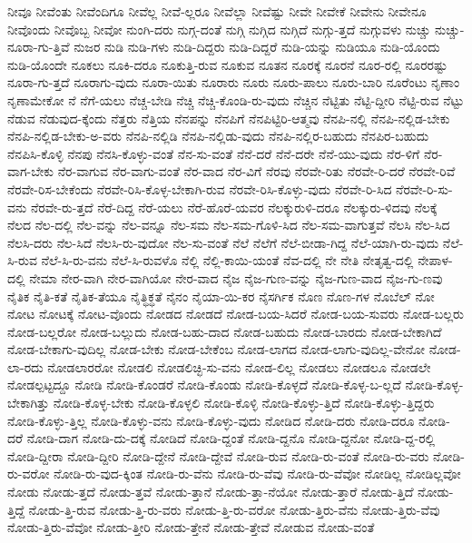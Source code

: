 {ನೀವೂ
ನೀವೆಂತು
ನೀವೆಂದಿಗೂ
ನೀವೆಲ್ಲ
ನೀವೆ-ಲ್ಲರೂ
ನೀವೆಲ್ಲಾ
ನೀವೆಷ್ಟು
ನೀವೇ
ನೀವೇಕೆ
ನೀವೇನು
ನೀವೇನೂ
ನೀವೊಂದು
ನೀವೊಬ್ಬ
ನೀವೋ
ನುಂಗಿ-ದರು
ನುಗ್ಗ-ದಂತೆ
ನುಗ್ಗಿ
ನುಗ್ಗಿದ
ನುಗ್ಗಿದೆ
ನುಗ್ಗು-ತ್ತದೆ
ನುಗ್ಗುವಳು
ನುಚ್ಚು
ನುಚ್ಚು-ನೂರಾ-ಗು-ತ್ತಿವೆ
ನುಜರ
ನುಡಿ
ನುಡಿ-ಗಳು
ನುಡಿ-ದಿದ್ದರು
ನುಡಿ-ದಿದ್ದರೆ
ನುಡಿ-ಯನ್ನು
ನುಡಿಯೂ
ನುಡಿ-ಯೊಂದು
ನುಡಿ-ಯೊಂದೇ
ನೂಕಲು
ನೂಕಿ-ದರೂ
ನೂಕುತ್ತಿ-ರುವ
ನೂಕುವ
ನೂತನ
ನೂರಕ್ಕೆ
ನೂರನೆ
ನೂರ-ರಲ್ಲಿ
ನೂರರಷ್ಟು
ನೂರಾ-ಗು-ತ್ತದೆ
ನೂರಾಗು-ವುದು
ನೂರಾ-ಯಿತು
ನೂರಾರು
ನೂರು
ನೂರು-ಪಾಲು
ನೂರು-ಬಾರಿ
ನೂರೆಂಟು
ನೃಣಾಂ
ನೃಣಾಮೇಕೋ
ನೆ
ನೆಗೆ-ಯಲು
ನೆಚ್ಚ-ಬೇಡಿ
ನೆಚ್ಚಿ
ನೆಚ್ಚಿ-ಕೊಂಡಿ-ರು-ವುದು
ನೆಚ್ಚಿನ
ನೆಟ್ಟಿತು
ನೆಟ್ಟಿ-ದ್ದೀರಿ
ನೆಟ್ಟಿ-ರುವ
ನೆಟ್ಟು
ನೆಡುವ
ನೆಡುವುದ-ಕ್ಕೆಂದು
ನೆತ್ತರು
ನೆತ್ತಿಯ
ನೆನಪನ್ನು
ನೆನಪಿಗೆ
ನೆನಪಿಟ್ಟಿರಿ-ಆತ್ಮವು
ನೆನಪಿ-ನಲ್ಲಿ
ನೆನಪಿ-ನಲ್ಲಿಡ-ಬೇಕು
ನೆನಪಿ-ನಲ್ಲಿಡ-ಬೇಕು-ಅ-ವರು
ನೆನಪಿ-ನಲ್ಲಿಡಿ
ನೆನಪಿ-ನಲ್ಲಿಡು-ವುದು
ನೆನಪಿ-ನಲ್ಲಿರ-ಬಹುದು
ನೆನಪಿರ-ಬಹುದು
ನೆನಪಿಸಿ-ಕೊಳ್ಳಿ
ನೆನಪು
ನೆನಸಿ-ಕೊಳ್ಳು-ವಂತೆ
ನೆನ-ಸು-ವಂತೆ
ನೆನೆ-ದರೆ
ನೆನೆ-ದರೇ
ನೆನೆ-ಯು-ವುದು
ನೆರ-ಳಿಗೆ
ನೆರ-ವಾಗ-ಬೇಕು
ನೆರ-ವಾಗುವ
ನೆರ-ವಾಗು-ವಂತೆ
ನೆರ-ವಾದ
ನೆರ-ವಿಗೆ
ನೆರವು
ನೆರವೇ-ರಿತು
ನೆರವೇ-ರಿ-ದರೆ
ನೆರವೇ-ರಿವೆ
ನೆರವೇ-ರಿಸ-ಬೇಕೆಂದು
ನೆರವೇ-ರಿಸಿ-ಕೊಳ್ಳ-ಬೇಕಾಗಿ-ರುವ
ನೆರವೇ-ರಿಸಿ-ಕೊಳ್ಳು-ವುದು
ನೆರವೇ-ರಿ-ಸಿದ
ನೆರವೇ-ರಿ-ಸು-ವನು
ನೆರವೇ-ರು-ತ್ತದೆ
ನೆರೆ-ದಿದ್ದ
ನೆರೆ-ಯಲು
ನೆರೆ-ಹೊರೆ-ಯವರ
ನೆಲಕ್ಕುರುಳಿ-ದರೂ
ನೆಲಕ್ಕುರು-ಳಿದವು
ನೆಲಕ್ಕೆ
ನೆಲದ
ನೆಲ-ದಲ್ಲಿ
ನೆಲ-ವನ್ನು
ನೆಲ-ವನ್ನೂ
ನೆಲ-ಸಮ
ನೆಲ-ಸಮ-ಗೊಳಿ-ಸಿದ
ನೆಲ-ಸಮ-ವಾಗುತ್ತವೆ
ನೆಲಸಿ
ನೆಲ-ಸಿದ
ನೆಲಸಿ-ದರು
ನೆಲ-ಸಿದೆ
ನೆಲಸಿ-ರು-ವುದೋ
ನೆಲ-ಸು-ವಂತೆ
ನೆಲೆ
ನೆಲೆಗೆ
ನೆಲೆ-ಬೀಡಾ-ಗಿದ್ದ
ನೆಲೆ-ಯಾಗಿ-ರು-ವುದು
ನೆಲೆ-ಸಿ-ರುವ
ನೆಲೆ-ಸಿ-ರು-ವನು
ನೆಲೆ-ಸಿ-ರುವಳೊ
ನೆಲ್ಲಿ
ನೆಲ್ಲಿ-ಕಾಯಿ-ಯಂತೆ
ನೆವ-ದಲ್ಲಿ
ನೇ
ನೇತಿ
ನೇತೃತ್ವ-ದಲ್ಲಿ
ನೇಪಾಳ-ದಲ್ಲಿ
ನೇಮಾ
ನೇರ-ವಾಗಿ
ನೇರ-ವಾಗಿಯೋ
ನೇರ-ವಾದ
ನೈಜ
ನೈಜ-ಗುಣ-ವನ್ನು
ನೈಜ-ಗುಣ-ವಾದ
ನೈಜ-ಗು-ಣವು
ನೈತಿಕ
ನೈತಿ-ಕತೆ
ನೈತಿಕ-ತೆಯೂ
ನೈತ್ಧಿಕ್ಧತೆ
ನೈನಂ
ನೈಯಾ-ಯಿ-ಕರ
ನೈಸರ್ಗಿಕ
ನೊಣ
ನೊಣ-ಗಳ
ನೊಬೆಲ್
ನೋ
ನೋಟ
ನೋಟಕ್ಕೆ
ನೋಟ-ವೊಂದು
ನೋಡದ
ನೋಡದೆ
ನೋಡ-ಬಯ-ಸಿದರೆ
ನೋಡ-ಬಯ-ಸುವರು
ನೋಡ-ಬಲ್ಲರು
ನೋಡ-ಬಲ್ಲರೋ
ನೋಡ-ಬಲ್ಲುದು
ನೋಡ-ಬಹು-ದಾದ
ನೋಡ-ಬಹುದು
ನೋಡ-ಬಾರದು
ನೋಡ-ಬೇಕಾಗಿದೆ
ನೋಡ-ಬೇಕಾಗು-ವುದಿಲ್ಲ
ನೋಡ-ಬೇಕು
ನೋಡ-ಬೇಕೆಂಬ
ನೋಡ-ಲಾಗದ
ನೋಡ-ಲಾಗು-ವುದಿಲ್ಲ-ವೇನೋ
ನೋಡ-ಲಾ-ರದು
ನೋಡಲಾರರೋ
ನೋಡಲಿ
ನೋಡಲಿಚ್ಛಿ-ಸು-ವನು
ನೋಡ-ಲಿಲ್ಲ
ನೋಡಲು
ನೋಡಲೂ
ನೋಡಲೇ
ನೋಡಲ್ಪಟ್ಟದ್ದೂ
ನೋಡಿ
ನೋಡಿ-ಕೊಂಡರೆ
ನೋಡಿ-ಕೊಂಡು
ನೋಡಿ-ಕೊಳ್ಳದೆ
ನೋಡಿ-ಕೊಳ್ಳ-ಬ-ಲ್ಲದೆ
ನೋಡಿ-ಕೊಳ್ಳ-ಬೇಕಾಗಿತ್ತು
ನೋಡಿ-ಕೊಳ್ಳ-ಬೇಕು
ನೋಡಿ-ಕೊಳ್ಳಲಿ
ನೋಡಿ-ಕೊಳ್ಳಿ
ನೋಡಿ-ಕೊಳ್ಳು-ತ್ತಿದೆ
ನೋಡಿ-ಕೊಳ್ಳು-ತ್ತಿದ್ದರು
ನೋಡಿ-ಕೊಳ್ಳು-ತ್ತಿಲ್ಲ
ನೋಡಿ-ಕೊಳ್ಳು-ವನು
ನೋಡಿ-ಕೊಳ್ಳು-ವುದು
ನೋಡಿದ
ನೋಡಿ-ದರು
ನೋಡಿ-ದರೂ
ನೋಡಿ-ದರೆ
ನೋಡಿ-ದಾಗ
ನೋಡಿ-ದು-ದಕ್ಕೆ
ನೋಡಿದೆ
ನೋಡಿ-ದ್ದಂತೆ
ನೋಡಿ-ದ್ದನೊ
ನೋಡಿ-ದ್ದನೋ
ನೋಡಿ-ದ್ದ-ರಲ್ಲಿ
ನೋಡಿ-ದ್ದೀರಾ
ನೋಡಿ-ದ್ದೀರಿ
ನೋಡಿ-ದ್ದೇನೆ
ನೋಡಿ-ದ್ದೇವೆ
ನೋಡಿ-ರುವ
ನೋಡಿ-ರು-ವಂತೆ
ನೋಡಿ-ರು-ವರು
ನೋಡಿ-ರು-ವರೋ
ನೋಡಿ-ರು-ವುದ-ಕ್ಕಿಂತ
ನೋಡಿ-ರು-ವೆನು
ನೋಡಿ-ರು-ವೆವು
ನೋಡಿ-ರು-ವೆವೋ
ನೋಡಿಲ್ಲ
ನೋಡಿಲ್ಲವೋ
ನೋಡು
ನೋಡು-ತ್ತದೆ
ನೋಡು-ತ್ತವೆ
ನೋಡು-ತ್ತಾನೆ
ನೋಡು-ತ್ತಾ-ನೆಯೋ
ನೋಡು-ತ್ತಾರೆ
ನೋಡು-ತ್ತಿದೆ
ನೋಡು-ತ್ತಿದ್ದೆ
ನೋಡು-ತ್ತಿ-ರುವ
ನೋಡು-ತ್ತಿ-ರು-ವರು
ನೋಡು-ತ್ತಿ-ರು-ವರೋ
ನೋಡು-ತ್ತಿರು-ವೆನು
ನೋಡು-ತ್ತಿರು-ವೆವು
ನೋಡು-ತ್ತಿರು-ವೆವೋ
ನೋಡು-ತ್ತೀರಿ
ನೋಡು-ತ್ತೇನೆ
ನೋಡು-ತ್ತೇವೆ
ನೋಡುವ
ನೋಡು-ವಂತೆ
}
